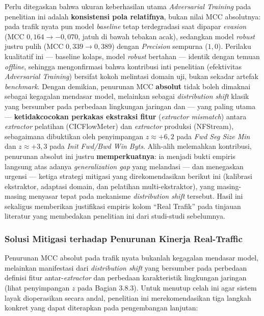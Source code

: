 \documentclass[11pt, a4paper]{article}
\begin{document}
Perlu ditegaskan bahwa ukuran keberhasilan utama \textit{Adversarial Training} pada penelitian ini adalah \textbf{konsistensi pola relatifnya}, bukan nilai MCC absolutnya: pada trafik nyata pun model \textit{baseline} tetap terdegradasi saat dipapar \textit{evasion} (MCC $0{,}164 \rightarrow -0{,}070$, jatuh di bawah tebakan acak), sedangkan model \textit{robust} justru pulih (MCC $0{,}339 \rightarrow 0{,}389$) dengan \textit{Precision} sempurna ($1{,}0$). Perilaku kualitatif ini --- baseline kolaps, model \textit{robust} bertahan --- identik dengan temuan \textit{offline}, sehingga mengonfirmasi bahwa kontribusi inti penelitian (efektivitas \textit{Adversarial Training}) bersifat kokoh melintasi domain uji, bukan sekadar artefak \textit{benchmark}. Dengan demikian, penurunan MCC \textbf{absolut} tidak boleh dimaknai sebagai kegagalan mendasar model, melainkan sebagai \textit{distribution shift} klasik yang bersumber pada perbedaan lingkungan jaringan dan --- yang paling utama --- \textbf{ketidakcocokan perkakas ekstraksi fitur} (\textit{extractor mismatch}) antara \textit{extractor} pelatihan (CICFlowMeter) dan \textit{extractor} produksi (NFStream), sebagaimana dibuktikan oleh penyimpangan $z \approx +6{,}2$ pada \textit{Fwd Seg Size Min} dan $z \approx +3{,}3$ pada \textit{Init Fwd/Bwd Win Byts}. Alih-alih melemahkan kontribusi, penurunan absolut ini justru \textbf{memperkuatnya}: ia menjadi bukti empiris langsung atas adanya \textit{generalization gap} yang melandasi --- dan menegaskan urgensi --- ketiga strategi mitigasi yang direkomendasikan berikut ini (kalibrasi ekstraktor, adaptasi domain, dan pelatihan multi-ekstraktor), yang masing-masing menyasar tepat pada mekanisme \textit{distribution shift} tersebut. Hasil ini sekaligus memberikan justifikasi empiris kolom ``Real Trafik'' pada tinjauan literatur yang membedakan penelitian ini dari studi-studi sebelumnya.

\subsubsection{Solusi Mitigasi terhadap Penurunan Kinerja Real-Traffic}
Penurunan MCC absolut pada trafik nyata bukanlah kegagalan mendasar model, melainkan manifestasi dari \textit{distribution shift} yang bersumber pada perbedaan definisi fitur antar-\textit{extractor} dan perbedaan karakteristik lingkungan jaringan (lihat penyimpangan $z$ pada Bagian 3.8.3). Untuk menutup celah ini agar sistem layak dioperasikan secara andal, penelitian ini merekomendasikan tiga langkah konkret yang dapat diterapkan pada pengembangan lanjutan:
\end{document}
